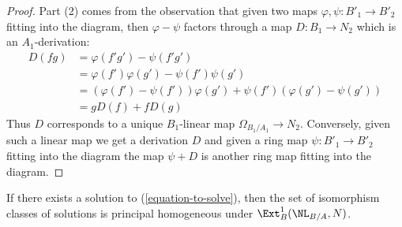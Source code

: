 \begin{proof}
\medskip\noindent
Part (2) comes from the observation that given two maps
$\varphi, \psi : B'_1 \to B'_2$ fitting into the diagram, then
$\varphi - \psi$ factors through a map $D : B_1 \to N_2$ which
is an $A_1$-derivation:
\begin{align*}
D(fg) & = \varphi(f'g') - \psi(f'g') \\
& =
\varphi(f')\varphi(g') - \psi(f')\psi(g') \\
& =
(\varphi(f') - \psi(f'))\varphi(g') + \psi(f')(\varphi(g') - \psi(g')) \\
& =
gD(f) + fD(g)
\end{align*}
Thus $D$ corresponds to a unique $B_1$-linear map
$\Omega_{B_1/A_1} \to N_2$. Conversely, given such a linear map
we get a derivation $D$ and given a ring map $\psi : B'_1 \to B'_2$
fitting into the diagram
the map $\psi + D$ is another ring map fitting into the diagram.
\end{proof}

\begin{lemma}
\label{lemma-choices}
If there exists a solution to (\ref{equation-to-solve}), then the set of
isomorphism classes of solutions is principal homogeneous under
$\Ext^1_B(\NL_{B/A}, N)$.
\end{lemma}

